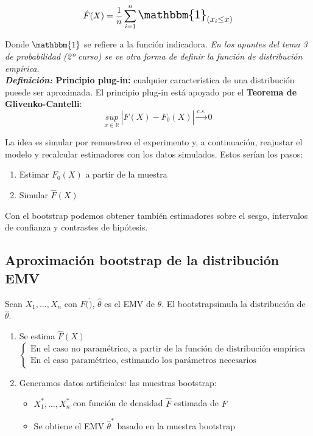 $$\hat{F}(X)=\frac{1}{n}\sum_{i=1}^{n}\text{\Large{$\mathbbm{1}_{(x_i\leq x)}$}}$$

Donde $\mathbbm{1}$ se refiere a la función indicadora. \textit{En los apuntes del tema 3 de probabilidad (2º curso) se ve otra forma de definir la función de distribución empírica}.\\

\textbf{\textit{Definición:} Principio plug-in:} cualquier característica de una distribución pueede ser aproximada. El principio plug-in está apoyado por el \textbf{Teorema de Glivenko-Cantelli}:
$$\underset{x\in\mathbb{R}}{sup}\ |\hat F(X)-F_0(X)|\overset{c.s.}{\longrightarrow}0$$

La idea es simular por remuestreo el experimento y, a continuación, reajustar el modelo y recalcular estimadores con los datos simulados. Estos serían los pasos:
\begin{enumerate}
    \item Estimar $F_0(X)$ a partir de la muestra
    \item Simular $\hat F(X)$
\end{enumerate}
Con el bootstrap podemos obtener también estimadores sobre el sesgo, intervalos de confianza y contrastes de hipótesis.

\subsection{Aproximación bootstrap de la distribución EMV}

Sean $X_1,\dots,X_n$ con $F(\dot)$, $\hat\theta$ es el EMV de $\theta$. El bootstrapsimula la distribución de $\hat\theta$.
\begin{enumerate}
    \item Se estima $\hat F(X)$$\begin{cases}
        \text{En el caso no paramétrico, a partir de la función de distribución empírica}\\
        \text{En el caso paramétrico, estimando los parámetros necesarios}
    \end{cases}$
    \item Generamos datos artificiales: las muestras bootstrap:
        \begin{itemize}
            \item $X_1^*,\dots,X_n^*$ con función de densidad $\hat F$ estimada de $F$ 
            \item Se obtiene el EMV $\hat\theta^*$ basado en la muestra bootstrap
        \end{itemize}
\end{enumerate}


